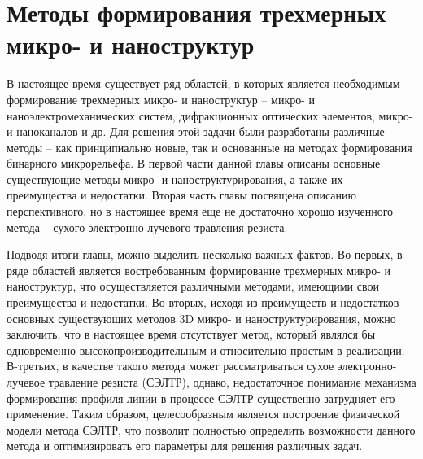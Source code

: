\chapter{Методы формирования трехмерных микро- и наноструктур}

В настоящее время существует ряд областей, в которых является необходимым формирование трехмерных микро- и наноструктур -- микро- и наноэлектромеханических систем, дифракционных оптических элементов, микро- и наноканалов и др. Для решения этой задачи были разработаны различные методы -- как принципиально новые, так и основанные на методах формирования бинарного микрорельефа. В первой части данной главы описаны основные существующие методы микро- и наноструктурирования, а также их преимущества и недостатки. Вторая часть главы посвящена описанию перспективного, но в настоящее время еще не достаточно хорошо изученного метода -- сухого электронно-лучевого травления резиста.




Подводя итоги главы, можно выделить несколько важных фактов. Во-первых, в ряде областей является востребованным формирование трехмерных микро- и наноструктур, что осуществляется различными методами, имеющими свои преимущества и недостатки. Во-вторых, исходя из преимуществ и недостатков основных существующих методов 3D микро- и наноструктурирования, можно заключить, что в настоящее время отсутствует метод, который являлся бы одновременно высокопроизводительным и относительно простым в реализации. В-третьих, в качестве такого метода может рассматриваться сухое электронно-лучевое травление резиста (СЭЛТР), однако, недостаточное понимание механизма формирования профиля линии в процессе СЭЛТР существенно затрудняет его применение. Таким образом, целесообразным является построение физической модели метода СЭЛТР, что позволит полностью определить возможности данного метода и оптимизировать его параметры для решения различных задач.
